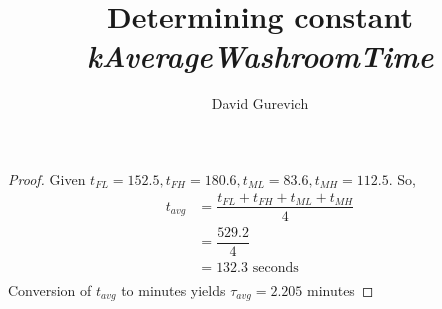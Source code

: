 \documentclass[preview, border=12pt, varwidth]{standalone}
\title{Determining constant \textit{kAverageWashroomTime}}
\author{David Gurevich}
\date{}
\begin{document}
\maketitle

\begin{proof}
	Given $t_{FL} = 152.5, t_{FH} = 180.6, t_{ML} = 83.6, t_{MH} = 112.5$.\cite{rawls1988restroom} So,
	\begin{align*}
	t_{avg} &= \dfrac{t_{FL} + t_{FH} + t_{ML} + t_{MH}}{4} \\
	&= \dfrac{529.2}{4} \\
	&= 132.3 \text{ seconds} \\
	\end{align*}
	Conversion of $t_{avg}$ to minutes yields $\tau_{avg} = 2.205$ minutes
\end{proof}



\end{document}
